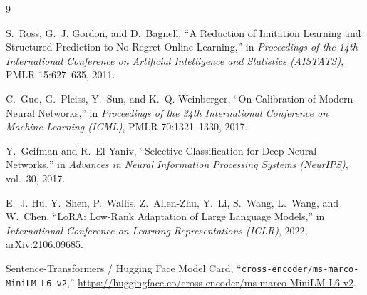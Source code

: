 \documentclass[11pt,a4paper]{article}
\begin{document}
\begin{thebibliography}{9}

S.~Ross, G.~J. Gordon, and D.~Bagnell,
``A Reduction of Imitation Learning and Structured Prediction to No-Regret Online Learning,''
in \emph{Proceedings of the 14th International Conference on Artificial Intelligence and Statistics (AISTATS)}, PMLR 15:627--635, 2011.

C.~Guo, G.~Pleiss, Y.~Sun, and K.~Q. Weinberger,
``On Calibration of Modern Neural Networks,''
in \emph{Proceedings of the 34th International Conference on Machine Learning (ICML)}, PMLR 70:1321--1330, 2017.

Y.~Geifman and R.~El-Yaniv,
``Selective Classification for Deep Neural Networks,''
in \emph{Advances in Neural Information Processing Systems (NeurIPS)}, vol.~30, 2017.

E.~J. Hu, Y.~Shen, P.~Wallis, Z.~Allen-Zhu, Y.~Li, S.~Wang, L.~Wang, and W.~Chen,
``LoRA: Low-Rank Adaptation of Large Language Models,''
in \emph{International Conference on Learning Representations (ICLR)}, 2022, arXiv:2106.09685.

Sentence-Transformers / Hugging Face Model Card,
``\texttt{cross-encoder/ms-marco-MiniLM-L6-v2},''
\url{https://huggingface.co/cross-encoder/ms-marco-MiniLM-L6-v2}.

\end{thebibliography}
\end{document}
